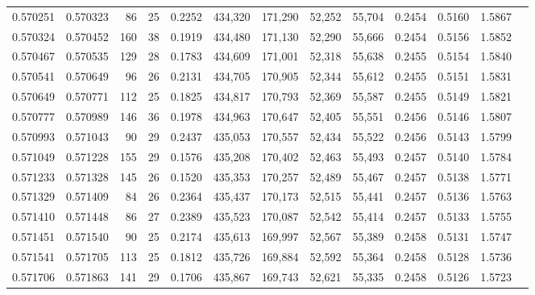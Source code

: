 \begin{tabular}{rrrrrrrrrrrrr}
0.570251 & 0.570323 &    86 &  25 &                                     0.2252 & 434,320 & 171,290 &  52,252 &  55,704 & 0.2454 & 0.5160 & 1.5867 \\
0.570324 & 0.570452 &   160 &  38 &                                     0.1919 & 434,480 & 171,130 &  52,290 &  55,666 & 0.2454 & 0.5156 & 1.5852 \\
0.570467 & 0.570535 &   129 &  28 &                                     0.1783 & 434,609 & 171,001 &  52,318 &  55,638 & 0.2455 & 0.5154 & 1.5840 \\
0.570541 & 0.570649 &    96 &  26 &                                     0.2131 & 434,705 & 170,905 &  52,344 &  55,612 & 0.2455 & 0.5151 & 1.5831 \\
0.570649 & 0.570771 &   112 &  25 &                                     0.1825 & 434,817 & 170,793 &  52,369 &  55,587 & 0.2455 & 0.5149 & 1.5821 \\
0.570777 & 0.570989 &   146 &  36 &                                     0.1978 & 434,963 & 170,647 &  52,405 &  55,551 & 0.2456 & 0.5146 & 1.5807 \\
0.570993 & 0.571043 &    90 &  29 &                                     0.2437 & 435,053 & 170,557 &  52,434 &  55,522 & 0.2456 & 0.5143 & 1.5799 \\
0.571049 & 0.571228 &   155 &  29 &                                     0.1576 & 435,208 & 170,402 &  52,463 &  55,493 & 0.2457 & 0.5140 & 1.5784 \\
0.571233 & 0.571328 &   145 &  26 &                                     0.1520 & 435,353 & 170,257 &  52,489 &  55,467 & 0.2457 & 0.5138 & 1.5771 \\
0.571329 & 0.571409 &    84 &  26 &                                     0.2364 & 435,437 & 170,173 &  52,515 &  55,441 & 0.2457 & 0.5136 & 1.5763 \\
0.571410 & 0.571448 &    86 &  27 &                                     0.2389 & 435,523 & 170,087 &  52,542 &  55,414 & 0.2457 & 0.5133 & 1.5755 \\
0.571451 & 0.571540 &    90 &  25 &                                     0.2174 & 435,613 & 169,997 &  52,567 &  55,389 & 0.2458 & 0.5131 & 1.5747 \\
0.571541 & 0.571705 &   113 &  25 &                                     0.1812 & 435,726 & 169,884 &  52,592 &  55,364 & 0.2458 & 0.5128 & 1.5736 \\
0.571706 & 0.571863 &   141 &  29 &                                     0.1706 & 435,867 & 169,743 &  52,621 &  55,335 & 0.2458 & 0.5126 & 1.5723 \\

\end{tabular}
